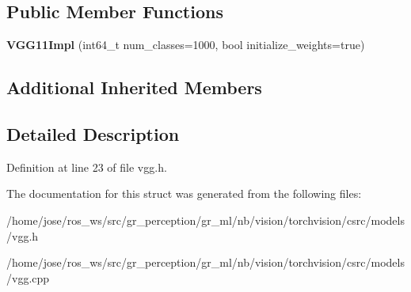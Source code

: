 \subsection*{Public Member Functions}
\begin{DoxyCompactItemize}
\item 
\mbox{\label{structvision_1_1models_1_1VGG11Impl_ae37b460f738e12e0acd1a9ff0bed24e9}} 
{\bfseries V\+G\+G11\+Impl} (int64\+\_\+t num\+\_\+classes=1000, bool initialize\+\_\+weights=true)
\end{DoxyCompactItemize}
\subsection*{Additional Inherited Members}


\subsection{Detailed Description}


Definition at line 23 of file vgg.\+h.



The documentation for this struct was generated from the following files\+:\begin{DoxyCompactItemize}
\item 
/home/jose/ros\+\_\+ws/src/gr\+\_\+perception/gr\+\_\+ml/nb/vision/torchvision/csrc/models/vgg.\+h\item 
/home/jose/ros\+\_\+ws/src/gr\+\_\+perception/gr\+\_\+ml/nb/vision/torchvision/csrc/models/vgg.\+cpp\end{DoxyCompactItemize}
